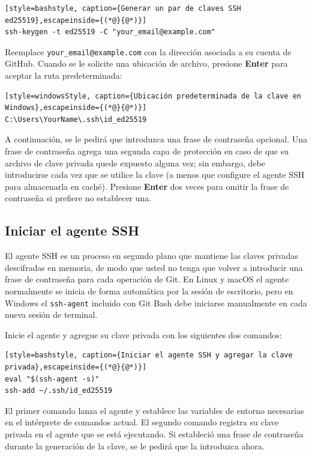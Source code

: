 \begin{lstlisting}[style=bashstyle, caption={Generar un par de claves SSH ed25519},escapeinside={(*@}{@*)}]
ssh-keygen -t ed25519 -C "your_email@example.com"
\end{lstlisting}

Reemplace \texttt{your\_email@example.com} con la dirección asociada a su cuenta de GitHub. Cuando se le solicite una ubicación de archivo, presione \textbf{Enter} para aceptar la ruta predeterminada:

\begin{lstlisting}[style=windowsStyle, caption={Ubicación predeterminada de la clave en Windows},escapeinside={(*@}{@*)}]
C:\Users\YourName\.ssh\id_ed25519
\end{lstlisting}

A continuación, se le pedirá que introduzca una frase de contraseña opcional. Una frase de contraseña agrega una segunda capa de protección en caso de que su archivo de clave privada quede expuesto alguna vez; sin embargo, debe introducirse cada vez que se utilice la clave (a menos que configure el agente SSH para almacenarla en caché). Presione \textbf{Enter} dos veces para omitir la frase de contraseña si prefiere no establecer una.

\subsection{Iniciar el agente SSH}

El agente SSH es un proceso en segundo plano que mantiene las claves privadas descifradas en memoria, de modo que usted no tenga que volver a introducir una frase de contraseña para cada operación de Git. En Linux y macOS el agente normalmente se inicia de forma automática por la sesión de escritorio, pero en Windows el \texttt{ssh-agent} incluido con Git Bash debe iniciarse manualmente en cada nueva sesión de terminal.

Inicie el agente y agregue su clave privada con los siguientes dos comandos:

\begin{lstlisting}[style=bashstyle, caption={Iniciar el agente SSH y agregar la clave privada},escapeinside={(*@}{@*)}]
eval "$(ssh-agent -s)"
ssh-add ~/.ssh/id_ed25519
\end{lstlisting}

El primer comando lanza el agente y establece las variables de entorno necesarias en el intérprete de comandos actual. El segundo comando registra su clave privada en el agente que se está ejecutando. Si estableció una frase de contraseña durante la generación de la clave, se le pedirá que la introduzca ahora.


